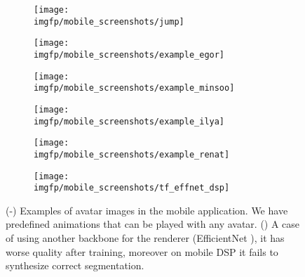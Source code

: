 \begin{figure}[hb]
	\centering
	\begin{subfigure}[b]{0.3\textwidth}
		\centering
		\texttt{[image: \\imgfp/mobile\_screenshots/jump]}%
		\caption{}
		\label{fig:mobile_example_jump}
	\end{subfigure}
	\hfill
	\begin{subfigure}[b]{0.3\textwidth}
		\centering
		\texttt{[image: \\imgfp/mobile\_screenshots/example\_egor]}
		\caption{}
	\end{subfigure}
	\hfill
	\begin{subfigure}[b]{0.3\textwidth}
		\centering
		\texttt{[image: \\imgfp/mobile\_screenshots/example\_minsoo]}
		\caption{}
	\end{subfigure}
	\vspace{1em}
		\begin{subfigure}[b]{0.3\textwidth}
		\centering
		\texttt{[image: \\imgfp/mobile\_screenshots/example\_ilya]}%
		\caption{}
	\end{subfigure}
	\hfill
	\begin{subfigure}[b]{0.3\textwidth}
		\centering
		\texttt{[image: \\imgfp/mobile\_screenshots/example\_renat]}
		\caption{}
		\label{fig:mobile_example_renat}
	\end{subfigure}
	\hfill
	\begin{subfigure}[b]{0.3\textwidth}
		\centering
		\texttt{[image: \\imgfp/mobile\_screenshots/tf\_effnet\_dsp]}
		\caption{}
		\label{fig:mobile_tf_effent_fail}
	\end{subfigure}
	\caption{(\protect{}-\protect{}) Examples of avatar images in the mobile application. We have predefined animations that can be played with any avatar. (\protect{}) A case of using another backbone for the renderer (EfficientNet \cite{dnn:efficientnetv1-19}), it has worse quality after training, moreover on mobile DSP it fails to synthesize correct segmentation. }
\end{figure}
